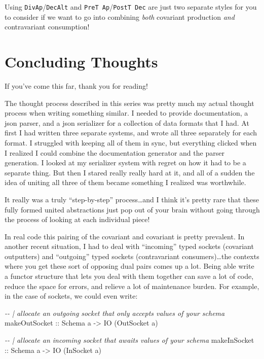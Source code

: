 \documentclass[]{article}
\newenvironment{Shaded}{}{}
\newcommand{\CommentTok}[1]{\textcolor[rgb]{0.38,0.63,0.69}{\textit{#1}}}
\newcommand{\DataTypeTok}[1]{\textcolor[rgb]{0.56,0.13,0.00}{#1}}
\newcommand{\NormalTok}[1]{#1}
\newcommand{\OtherTok}[1]{\textcolor[rgb]{0.00,0.44,0.13}{#1}}
\begin{document}
Using \texttt{DivAp}/\texttt{DecAlt} and \texttt{PreT\ Ap}/\texttt{PostT\ Dec}
are just two separate styles for you to consider if we want to go into combining
\emph{both} covariant production \emph{and} contravariant consumption!

\section{Concluding Thoughts}\label{concluding-thoughts}

If you've come this far, thank you for reading!

The thought process described in this series was pretty much my actual thought
process when writing something similar. I needed to provide documentation, a
json parser, and a json serializer for a collection of data formats that I had.
At first I had written three separate systems, and wrote all three separately
for each format. I struggled with keeping all of them in sync, but everything
clicked when I realized I could combine the documentation generator and the
parser generation. I looked at my serializer system with regret on how it had to
be a separate thing. But then I stared really really hard at it, and all of a
sudden the idea of uniting all three of them became something I realized was
worthwhile.

It really was a truly ``step-by-step'' process\ldots and I think it's pretty
rare that these fully formed united abstractions just pop out of your brain
without going through the process of looking at each individual piece!

In real code this pairing of the covariant and covariant is pretty prevalent. In
another recent situation, I had to deal with ``incoming'' typed sockets
(covariant outputters) and ``outgoing'' typed sockets (contravariant
consumers)\ldots the contexts where you get these sort of opposing dual pairs
comes up a lot. Being able write a functor structure that lets you deal with
them together can save a lot of code, reduce the space for errors, and relieve a
lot of maintenance burden. For example, in the case of sockets, we could even
write:

\begin{Shaded}
\begin{Highlighting}[]
\CommentTok{{-}{-} | allocate an outgoing socket that only accepts values of your schema}
\OtherTok{makeOutSocket ::} \DataTypeTok{Schema}\NormalTok{ a }\OtherTok{{-}\textgreater{}} \DataTypeTok{IO}\NormalTok{ (}\DataTypeTok{OutSocket}\NormalTok{ a)}

\CommentTok{{-}{-} | allocate an incoming socket that awaits values of your schema}
\OtherTok{makeInSocket ::} \DataTypeTok{Schema}\NormalTok{ a }\OtherTok{{-}\textgreater{}} \DataTypeTok{IO}\NormalTok{ (}\DataTypeTok{InSocket}\NormalTok{ a)}
\end{Highlighting}
\end{Shaded}
\end{document}
